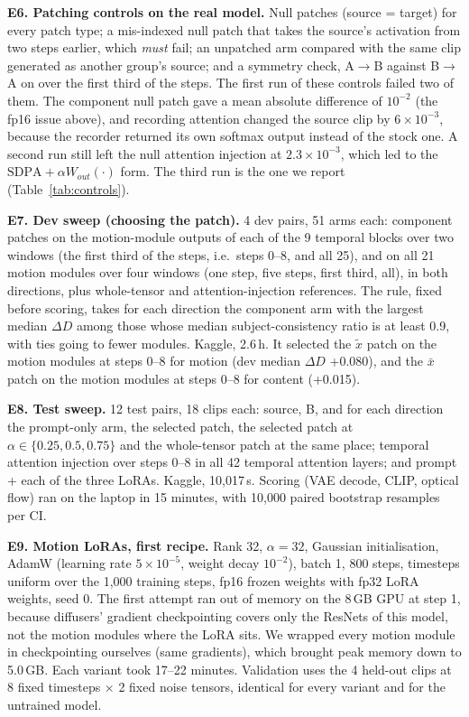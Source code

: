 \documentclass[twoside,english]{article}
\newcommand{\xs}{\bar{x}}         %
\newcommand{\xd}{\tilde{x}}       %
\newcommand{\dD}{\Delta D}
\begin{document}
\textbf{E6. Patching controls on the real model.} Null patches (source = target) for every patch type;
a mis-indexed null patch that takes the source's activation from two steps earlier, which \emph{must}
fail; an unpatched arm compared with the same clip generated as another group's source; and a symmetry
check, A$\to$B against B$\to$A on  over the first third of the steps. The first run of
these controls failed two of them. The component null patch gave a mean absolute difference of $10^{-2}$
(the fp16 issue above), and recording attention changed the source clip by $6\times10^{-3}$, because the
recorder returned its own softmax output instead of the stock one. A second run still left the null
attention injection at $2.3\times10^{-3}$, which led to the $\mathrm{SDPA} + \alpha W_{out}(\cdot)$ form. The
third run is the one we report (Table~\ref{tab:controls}).

\textbf{E7. Dev sweep (choosing the patch).} 4 dev pairs, 51 arms each: component patches on the
motion-module outputs of each of the 9 temporal blocks over two windows (the first third of the steps,
i.e.\ steps 0--8, and all 25), and on all 21 motion modules over four windows (one step, five steps, first
third, all), in both directions, plus whole-tensor and attention-injection references. The rule, fixed
before scoring, takes for each direction the component arm with the largest median $\dD$ among those whose
median subject-consistency ratio is at least 0.9, with ties going to fewer modules. Kaggle, 2.6\,h. It
selected the $\xd$ patch on the  motion modules at steps 0--8 for motion (dev median
$\dD$ +0.080), and the $\xs$ patch on the  motion modules at steps 0--8 for content (+0.015).

\textbf{E8. Test sweep.} 12 test pairs, 18 clips each: source, B, and for each direction the prompt-only
arm, the selected patch, the selected patch at $\alpha \in \{0.25, 0.5, 0.75\}$ and the whole-tensor patch
at the same place; temporal attention injection over steps 0--8 in all 42 temporal attention layers; and
prompt + each of the three LoRAs. Kaggle, 10{,}017\,s. Scoring (VAE decode, CLIP, optical flow) ran on the
laptop in 15 minutes, with 10{,}000 paired bootstrap resamples per CI.

\textbf{E9. Motion LoRAs, first recipe.} Rank 32, $\alpha=32$, Gaussian initialisation, AdamW (learning
rate $5\times10^{-5}$, weight decay $10^{-2}$), batch 1, 800 steps, timesteps uniform over the 1{,}000
training steps, fp16 frozen weights with fp32 LoRA weights, seed 0. The first attempt ran out of memory on
the 8\,GB GPU at step 1, because diffusers' gradient checkpointing covers only the ResNets of this model,
not the motion modules where the LoRA sits. We wrapped every motion module in checkpointing ourselves
(same gradients), which brought peak memory down to 5.0\,GB. Each variant took 17--22 minutes. Validation
uses the 4 held-out clips at 8 fixed timesteps $\times$ 2 fixed noise tensors, identical for every variant
and for the untrained model.
\end{document}
